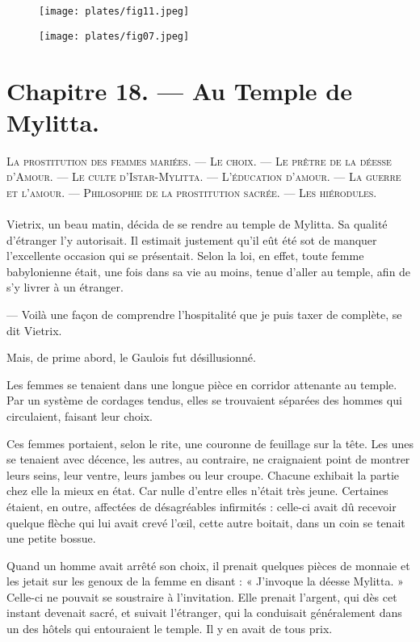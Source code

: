 \documentclass[a4paper, 11pt, oneside, polutonikogreek, french]{article}
\begin{document}
\begin{figure}[H]
\centering
\texttt{[image: plates/fig11.jpeg]}
\end{figure}
\clearpage
\begin{figure}[H]
\centering
\texttt{[image: plates/fig07.jpeg]}
\end{figure}
\section{Chapitre 18. --- Au Temple de Mylitta.}
\begin{center}
\scshape
\small
La prostitution des femmes mariées. --- Le choix. --- Le prêtre de la déesse d'Amour. --- Le culte d'Istar-Mylitta. --- L'éducation d'amour. --- La guerre et l'amour. --- Philosophie de la prostitution sacrée. --- Les hiérodules.
\end{center}
\paragraph{}
Vietrix, un beau matin, décida de se rendre au temple de Mylitta. Sa qualité d'étranger l'y autorisait. Il estimait justement qu'il eût été sot de manquer l'excellente occasion qui se présentait. Selon la loi, en effet, toute femme babylonienne était, une fois dans sa vie au moins, tenue d'aller au temple, afin de s'y livrer à un étranger.

--- Voilà une façon de comprendre l'hospitalité que je puis taxer de complète, se dit Vietrix.

Mais, de prime abord, le Gaulois fut désillusionné.

Les femmes se tenaient dans une longue pièce en corridor attenante au temple. Par un système de cordages tendus, elles se trouvaient séparées des hommes qui circulaient, faisant leur choix.

Ces femmes portaient, selon le rite, une couronne de feuillage sur la tête. Les unes se tenaient avec décence, les autres, au contraire, ne craignaient point de montrer leurs seins, leur ventre, leurs jambes ou leur croupe. Chacune exhibait la partie chez elle la mieux en état. Car nulle d'entre elles n'était très jeune. Certaines étaient, en outre, affectées de désagréables infirmités : celle-ci avait dû recevoir quelque flèche qui lui avait crevé l'œil, cette autre boitait, dans un coin se tenait une petite bossue.

Quand un homme avait arrêté son choix, il prenait quelques pièces de monnaie et les jetait sur les genoux de la femme en disant : « J'invoque la déesse Mylitta. » Celle-ci ne pouvait se soustraire à l'invitation. Elle prenait l'argent, qui dès cet instant devenait sacré, et suivait l'étranger, qui la conduisait généralement dans un des hôtels qui entouraient le temple. Il y en avait de tous prix.
\end{document}
